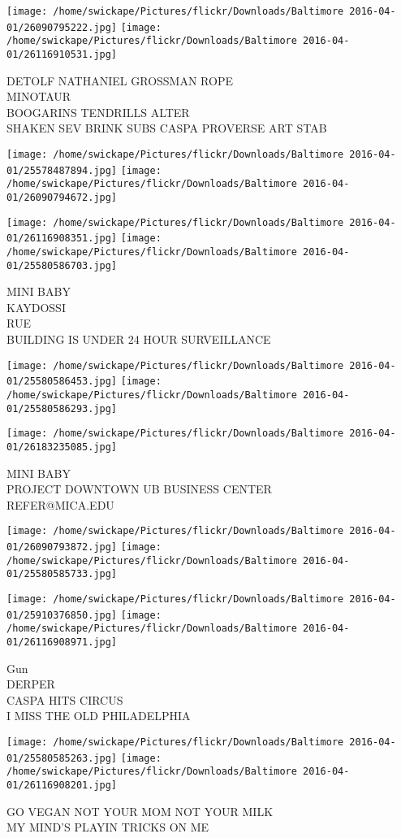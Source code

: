 \documentclass[10pt,letterpaper]{article}
\begin{document}
\texttt{[image: /home/swickape/Pictures/flickr/Downloads/Baltimore 2016-04-01/26090795222.jpg]}
\texttt{[image: /home/swickape/Pictures/flickr/Downloads/Baltimore 2016-04-01/26116910531.jpg]}

DETOLF NATHANIEL GROSSMAN ROPE\\
MINOTAUR\\
BOOGARINS TENDRILLS ALTER\\
SHAKEN SEV BRINK SUBS CASPA PROVERSE ART STAB
\pagebreak

\texttt{[image: /home/swickape/Pictures/flickr/Downloads/Baltimore 2016-04-01/25578487894.jpg]}
\texttt{[image: /home/swickape/Pictures/flickr/Downloads/Baltimore 2016-04-01/26090794672.jpg]}

\texttt{[image: /home/swickape/Pictures/flickr/Downloads/Baltimore 2016-04-01/26116908351.jpg]}
\texttt{[image: /home/swickape/Pictures/flickr/Downloads/Baltimore 2016-04-01/25580586703.jpg]}

MINI BABY\\
KAYDOSSI\\
RUE\\
BUILDING IS UNDER 24 HOUR SURVEILLANCE
\pagebreak

\texttt{[image: /home/swickape/Pictures/flickr/Downloads/Baltimore 2016-04-01/25580586453.jpg]}
\texttt{[image: /home/swickape/Pictures/flickr/Downloads/Baltimore 2016-04-01/25580586293.jpg]}

\vspace{0.25in}
\texttt{[image: /home/swickape/Pictures/flickr/Downloads/Baltimore 2016-04-01/26183235085.jpg]}

MINI BABY\\
PROJECT DOWNTOWN UB BUSINESS CENTER\\
REFER@MICA.EDU
\pagebreak

\texttt{[image: /home/swickape/Pictures/flickr/Downloads/Baltimore 2016-04-01/26090793872.jpg]}
\texttt{[image: /home/swickape/Pictures/flickr/Downloads/Baltimore 2016-04-01/25580585733.jpg]}

\texttt{[image: /home/swickape/Pictures/flickr/Downloads/Baltimore 2016-04-01/25910376850.jpg]}
\texttt{[image: /home/swickape/Pictures/flickr/Downloads/Baltimore 2016-04-01/26116908971.jpg]}

Gun\\
DERPER\\
CASPA HITS CIRCUS\\
I MISS THE OLD PHILADELPHIA
\pagebreak

\texttt{[image: /home/swickape/Pictures/flickr/Downloads/Baltimore 2016-04-01/25580585263.jpg]}
\texttt{[image: /home/swickape/Pictures/flickr/Downloads/Baltimore 2016-04-01/26116908201.jpg]}

GO VEGAN NOT YOUR MOM NOT YOUR MILK\\
MY MIND'S PLAYIN TRICKS ON ME
\pagebreak
\end{document}
